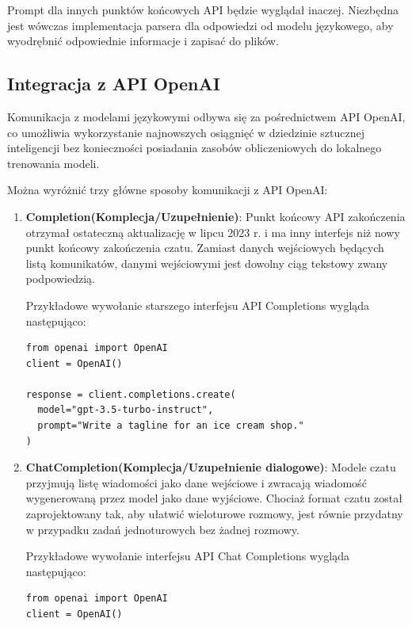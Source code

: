 Prompt dla innych punktów końcowych API będzie wyglądał inaczej. Niezbędna jest wówczas implementacja parsera dla odpowiedzi od modelu językowego, aby wyodrębnić odpowiednie informacje i zapisać do plików.

\subsection{Integracja z API OpenAI}
Komunikacja z modelami językowymi odbywa się za pośrednictwem API OpenAI, co umożliwia wykorzystanie najnowszych osiągnięć w dziedzinie sztucznej inteligencji bez konieczności posiadania zasobów obliczeniowych do lokalnego trenowania modeli. 

Można wyróżnić trzy główne sposoby komunikacji z API OpenAI:
\begin{enumerate}
    \item \textbf{Completion(Komplecja/Uzupełnienie)}: Punkt końcowy API zakończenia otrzymał ostateczną aktualizację w lipcu 2023 r. i ma inny interfejs niż nowy punkt końcowy zakończenia czatu. Zamiast danych wejściowych będących listą komunikatów, danymi wejściowymi jest dowolny ciąg tekstowy zwany podpowiedzią.

    Przykładowe wywołanie starszego interfejsu API Completions wygląda następująco:
    \begin{listing}
        \begin{verbatim}
from openai import OpenAI
client = OpenAI()

response = client.completions.create(
  model="gpt-3.5-turbo-instruct",
  prompt="Write a tagline for an ice cream shop."
)
        \end{verbatim}
    \end{listing}
    \item \textbf{ChatCompletion(Komplecja/Uzupełnienie dialogowe)}: Modele czatu przyjmują listę wiadomości jako dane wejściowe i zwracają wiadomość wygenerowaną przez model jako dane wyjściowe. Chociaż format czatu został zaprojektowany tak, aby ułatwić wieloturowe rozmowy, jest równie przydatny w przypadku zadań jednoturowych bez żadnej rozmowy.

    Przykładowe wywołanie interfejsu API Chat Completions wygląda następująco:
    \begin{listing}
        \begin{verbatim}
from openai import OpenAI
client = OpenAI()


\end{verbatim}
\end{listing}
\end{enumerate}
